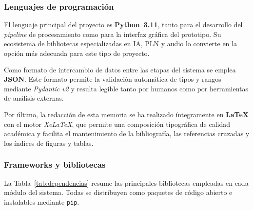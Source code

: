 \subsubsection{Lenguajes de programación}

El lenguaje principal del proyecto es \textbf{Python~3.11}, tanto para el desarrollo
del \emph{pipeline} de procesamiento como para la interfaz gráfica del prototipo.
Su ecosistema de bibliotecas especializadas en \ac{IA}, \ac{PLN} y audio lo convierte
en la opción más adecuada para este tipo de proyecto.

Como formato de intercambio de datos entre las etapas del sistema se emplea \\ \textbf{\ac{JSON}}. Este formato permite la validación automática de tipos
y rangos mediante \emph{Pydantic v2} y resulta legible tanto por humanos como por
herramientas de análisis externas.

Por último, la redacción de esta memoria se ha realizado íntegramente en
\textbf{\LaTeX{}} con el motor \emph{XeLaTeX}, que permite una composición tipográfica
de calidad académica y facilita el mantenimiento de la bibliografía, las referencias
cruzadas y los índices de figuras y tablas.


\subsubsection{Frameworks y bibliotecas}

La Tabla~\ref{tab:dependencias} resume las principales bibliotecas empleadas en cada
módulo del sistema. Todas se distribuyen como paquetes de código abierto e instalables
mediante \texttt{pip}.

